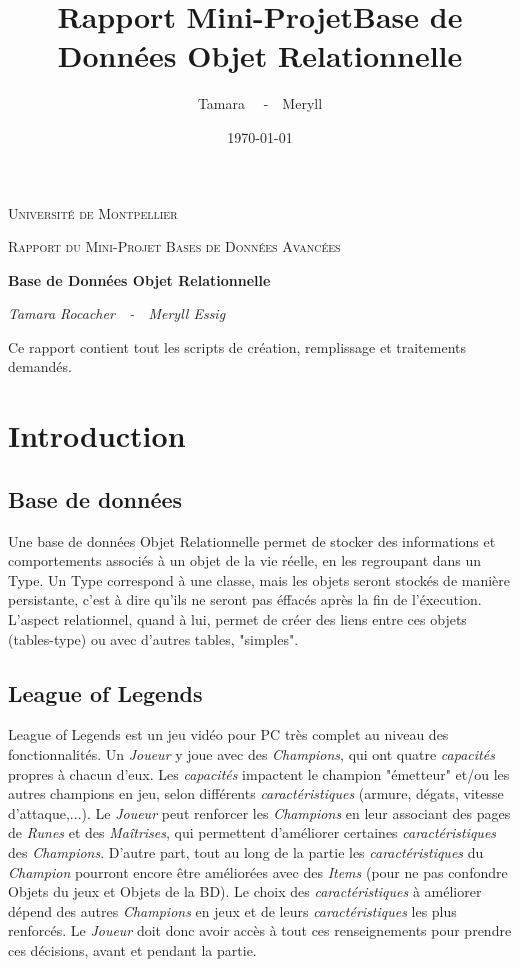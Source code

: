 \documentclass[a4paper,10pt]{report}
\title{\textbf{Rapport Mini-Projet}Base de Données Objet Relationnelle}
\author{Tamara \bsc{Rocacher}~~-~~Meryll \bsc{Essig}}
\date{\today}
\begin{document}
  \begin{titlepage}
  	\centering

{\scshape\LARGE Université de Montpellier \par}
  	\vspace{1cm}
{\scshape\Large Rapport du Mini-Projet Bases de Données Avancées\par}
  	\vspace{1.5cm}
    \vfill
  	{\huge\bfseries Base de Données Objet Relationnelle\par}
  	\vspace{2cm}


  	{\Large\itshape Tamara Rocacher~~-~~Meryll Essig\par}
  	\vspace{2cm}
  \vfill

 Ce rapport contient tout les scripts de création, remplissage et traitements demandés.

  \end{titlepage}


\tableofcontents


\chapter{Introduction} %
\section{Base de données}
  Une base de données Objet Relationnelle permet de stocker des informations et comportements associés à un objet de la vie réelle, en les regroupant dans un Type.
  Un Type correspond à une classe, mais les objets seront stockés de manière persistante, c'est à dire qu'ils ne seront pas éffacés après la fin de l'éxecution.
  L'aspect relationnel, quand à lui, permet de créer des liens entre ces objets (tables-type) ou avec d'autres tables, "simples".
\section{League of Legends}
  League of Legends est un jeu vidéo pour PC très complet au niveau des fonctionnalités. Un \textit{Joueur} y joue avec des \textit{Champions}, qui ont quatre \textit{capacités} propres à chacun d'eux. Les \textit{capacités} impactent le champion "émetteur" et/ou les autres champions en jeu, selon différents \textit{caractéristiques} (armure, dégats, vitesse d'attaque,...). Le \textit{Joueur} peut renforcer les \textit{Champions} en leur associant des pages de  \textit{Runes} et des \textit{Maîtrises}, qui permettent d'améliorer certaines \textit{caractéristiques} des \textit{Champions}. D'autre part, tout au long de la partie les \textit{caractéristiques} du \textit{Champion} pourront encore être améliorées avec des \textit{Items} (pour ne pas confondre Objets du jeux et Objets de la BD).
  Le choix des \textit{caractéristiques} à améliorer dépend des autres \textit{Champions} en jeux et de leurs \textit{caractéristiques} les plus renforcés. Le \textit{Joueur} doit donc avoir accès à tout ces renseignements pour prendre ces décisions, avant et pendant la partie.
\end{document}
